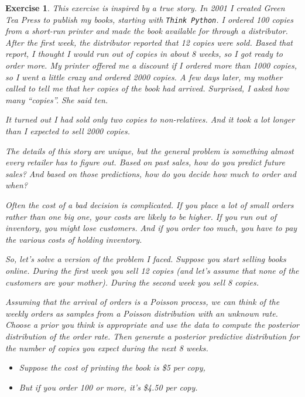 \documentclass[12pt]{book}
\theoremstyle{exercise}
\newtheorem{exercise}{Exercise}[chapter]
\begin{document}
\begin{exercise}

This exercise is inspired by a true story.  In 2001 I created Green Tea Press to publish my books, starting with {\tt Think Python}.  
I ordered 100 copies from a short-run printer and made the book available for through a distributor.  After the first week, the distributor reported that 12 copies were sold.  Based that report, I thought I would run out of copies in about 8 weeks, so I got ready to order more.  My printer offered me a discount if I ordered more than 1000 copies, so I went a little crazy and ordered 2000 copies.  A few days later, my mother called to tell me that her copies of the book had arrived.  Surprised, I asked how many ``copies''.  She said ten.

It turned out I had sold only two copies to non-relatives.  And it took a lot longer than I expected to sell 2000 copies.

The details of this story are unique, but the general problem is something almost every retailer has to figure out.  Based on past sales, how do you predict future sales?  And based on those predictions, how do you decide how much to order and when?

Often the cost of a bad decision is complicated.  If you place a lot of small orders rather than one big one, your costs are likely to be higher.  If you run out of inventory, you might lose customers.  And if you order too much, you have to pay the various costs of holding inventory.

So, let's solve a version of the problem I faced.  Suppose you start selling books online.  During the first week you sell 12 copies (and let's assume that none of the customers are your mother).  During the second week you sell 8 copies.

Assuming that the arrival of orders is a Poisson process, we can think of the weekly orders as samples from a Poisson distribution with an unknown rate.
Choose a prior you think is appropriate and use the data to compute the posterior distribution of the order rate.
Then generate a posterior predictive distribution for the number of copies you expect during the next 8 weeks.

\begin{itemize}

\item Suppose the cost of printing the book is \$5 per copy, 

\item But if you order 100 or more, it's \$4.50 per copy.


\end{itemize}
\end{exercise}
\end{document}
